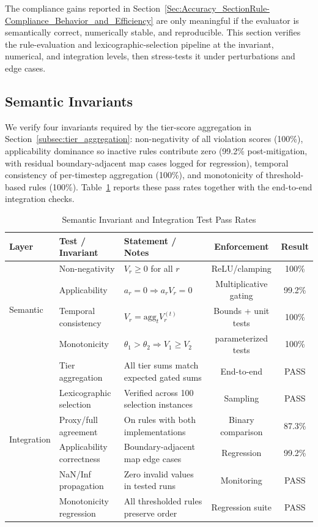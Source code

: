 
The compliance gains reported in Section~\ref{Sec:Accuracy_SectionRule-Compliance_Behavior_and_Efficiency} are only meaningful if the evaluator is semantically correct, numerically stable, and reproducible. This section verifies the rule-evaluation and lexicographic-selection pipeline at the invariant, numerical, and integration levels, then stress-tests it under perturbations and edge cases.

\subsection{Semantic Invariants}
\label{subsec:semantic_invariants}

We verify four invariants required by the tier-score aggregation in Section~\ref{subsec:tier_aggregation}: non-negativity of all violation scores (100\%), applicability dominance so inactive rules contribute zero (99.2\% post-mitigation, with residual boundary-adjacent map cases logged for regression), temporal consistency of per-timestep aggregation (100\%), and monotonicity of threshold-based rules (100\%). Table~\ref{tab:semantic_invariants} reports these pass rates together with the end-to-end integration checks.

\begin{table}
\centering
\caption{Semantic Invariant and Integration Test Pass Rates}
\label{tab:semantic_invariants}
\small
\begin{tabular}{lllcc}
\toprule
\textbf{Layer} & \textbf{Test / Invariant} & \textbf{Statement / Notes} & \textbf{Enforcement} & \textbf{Result} \\
\midrule
\multirow{4}{*}{Semantic}
& Non-negativity & $V_r \geq 0$ for all $r$ & ReLU/clamping & 100\% \\
& Applicability & $a_r{=}0 \Rightarrow a_r V_r{=}0$ & Multiplicative gating & 99.2\% \\
& Temporal consistency & $V_r=\mathrm{agg}_t V_r^{(t)}$ & Bounds + unit tests & 100\% \\
& Monotonicity & $\theta_1{>}\theta_2 \Rightarrow V_1{\geq} V_2$ & parameterized tests & 100\% \\
\midrule
\multirow{6}{*}{Integration}
& Tier aggregation & All tier sums match expected gated sums & End-to-end & PASS \\
& Lexicographic selection & Verified across 100 selection instances & Sampling & PASS \\
& Proxy/full agreement & On rules with both implementations & Binary comparison & 87.3\% \\
& Applicability correctness & Boundary-adjacent map edge cases & Regression & 99.2\% \\
& NaN/Inf propagation & Zero invalid values in tested runs & Monitoring & PASS \\
& Monotonicity regression & All thresholded rules preserve order & Regression suite & PASS \\
\bottomrule
\end{tabular}
\end{table}

